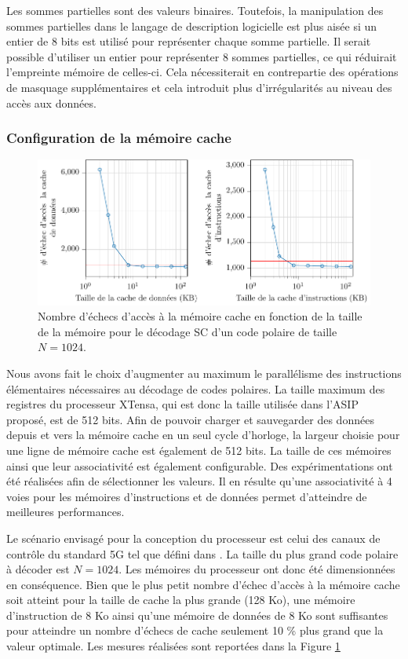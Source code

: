 Les sommes partielles sont des valeurs binaires. Toutefois, la manipulation des sommes partielles dans le langage de description logicielle est plus aisée si un entier de 8 bits est utilisé pour représenter chaque somme partielle. Il serait possible d'utiliser un entier pour représenter 8 sommes partielles, ce qui réduirait l'empreinte mémoire de celles-ci. Cela nécessiterait en contrepartie des opérations de masquage supplémentaires et cela introduit plus d'irrégularités au niveau des accès aux données.

\subsubsection{Configuration de la mémoire cache}
\begin{figure}
\centering
\includegraphics[width=\textwidth]{main/ch3_fig/curves/memory/tikz/memory}
\caption{Nombre d'échecs d'accès à la mémoire cache en fonction de la taille de la mémoire pour le décodage SC d'un code polaire de taille $N=1024$.}
\label{fig:tensilica_mem}
\end{figure}

Nous avons fait le choix d'augmenter au maximum le parallélisme des instructions élémentaires nécessaires au décodage de codes polaires. La taille maximum des registres du processeur XTensa, qui est donc la taille utilisée dans l'ASIP proposé, est de 512 bits. Afin de pouvoir charger et sauvegarder des données depuis et vers la mémoire cache en un seul cycle d'horloge, la largeur choisie pour une ligne de mémoire cache est également de 512 bits. La taille de ces mémoires ainsi que leur associativité est également configurable. Des expérimentations ont été réalisées afin de sélectionner les valeurs. Il en résulte qu'une associativité à 4 voies pour les mémoires d'instructions et de données permet d'atteindre de meilleures performances.

Le scénario envisagé pour la conception du processeur est celui des canaux de contrôle du standard 5G tel que défini dans \cite{3gpp_ts_2017}. La taille du plus grand code polaire à décoder est $N=1024$. Les mémoires du processeur ont donc été dimensionnées en conséquence.
Bien que le plus petit nombre d'échec d'accès à la mémoire cache soit atteint pour la taille de cache la plus grande (128 Ko), une mémoire d'instruction de 8 Ko ainsi qu'une mémoire de données de 8 Ko sont suffisantes pour atteindre un nombre d'échecs de cache seulement 10 \% plus grand que la valeur optimale. Les mesures réalisées sont reportées dans la Figure \ref{fig:tensilica_mem}

